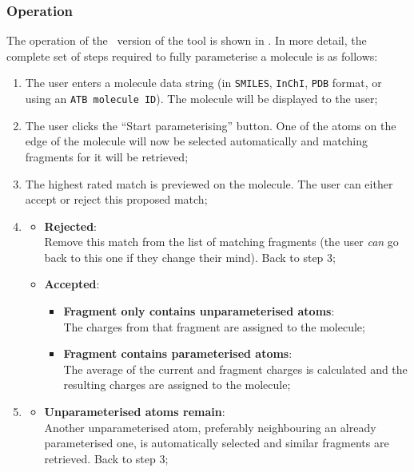 \subsubsection{Operation}
The operation of the \IDb\ version of the tool is shown in . In more detail, the complete set of steps required to fully parameterise a molecule is as follows:
\begin{enumerate}[itemsep=.1em, parsep=.2em, topsep=0em]
\item The user enters a molecule data string (in \verb|SMILES|, \verb|InChI|, \verb|PDB| format, or using an \verb|ATB molecule ID|). The molecule will be displayed to the user;
\item The user clicks the ``Start parameterising'' button. One of the atoms on the edge of the molecule will now be selected automatically and matching fragments for it will be retrieved;
\item The highest rated match is previewed on the molecule. The user can either accept or reject this proposed match;
\item
  \begin{itemize}[leftmargin=0cm, itemsep=.1em, parsep=.1em]
  \item[]{\bf Rejected}:\\Remove this match from the list of matching fragments (the user \emph{can} go back to this one if they change their mind). Back to step 3;
  \item[] {\bf Accepted}:
    \begin{itemize}[leftmargin=.5cm, itemsep=.1em, parsep=.1em]
    \item[] {\bf Fragment only contains unparameterised atoms}:\\
      The charges from that fragment are assigned to the molecule;
    \item[]{\bf Fragment contains parameterised atoms}:\\
      The average of the current and fragment charges is calculated and the resulting charges are assigned to the molecule;
    \end{itemize}
  \end{itemize}
\item
  \begin{itemize}[leftmargin=0cm, itemsep=.1em, parsep=.1em]
  \item[]{\bf Unparameterised atoms remain}:\\Another unparameterised atom, preferably neighbouring an already parameterised one, is automatically selected and similar fragments are retrieved. Back to step 3;

\end{itemize}
\end{enumerate}
